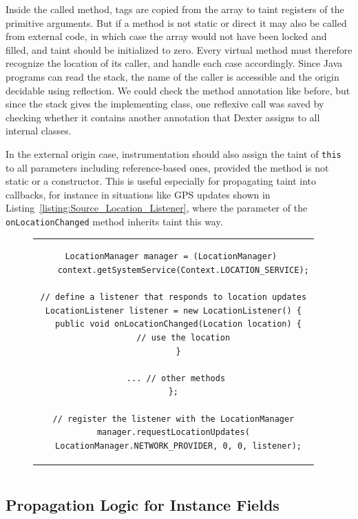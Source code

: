 \documentclass[12pt,twoside,notitlepage]{report}
\begin{document}
Inside the called method, tags are copied from the array to taint registers of the primitive arguments. But if a method is not static or direct it may also be called from external code, in which case the array would not have been locked and filled, and taint should be initialized to zero. Every virtual method must therefore recognize the location of its caller, and handle each case accordingly. Since Java programs can read the stack, the name of the caller is accessible and the origin decidable using reflection. We could check the method annotation like before, but since the stack gives the implementing class, one reflexive call was saved by checking whether it contains another annotation that Dexter assigns to all internal classes.

In the external origin case, instrumentation should also assign the taint of \verb$this$ to all parameters including reference-based ones, provided the method is not static or a constructor. This is useful especially for propagating taint into callbacks, for instance in situations like GPS updates shown in Listing~\ref{listing:Source_Location_Listener}, where the parameter of the \verb$onLocationChanged$ method inherits taint this way.

\begin{figure}
	\centering
	\begin{tabular}{c}
	\begin{lstlisting}
LocationManager manager = (LocationManager) 
	context.getSystemService(Context.LOCATION_SERVICE);

// define a listener that responds to location updates
LocationListener listener = new LocationListener() {
  public void onLocationChanged(Location location) {
    // use the location
  }

  ... // other methods 
};

// register the listener with the LocationManager
manager.requestLocationUpdates(
  LocationManager.NETWORK_PROVIDER, 0, 0, listener);
	\end{lstlisting}
	\end{tabular}
	\begin{lstlisting}[caption={Example of a location-updating callback class},
	                   label={listing:Source_Location_Listener}]
	\end{lstlisting}
\end{figure}

\subsection{Propagation Logic for Instance Fields}
\end{document}
